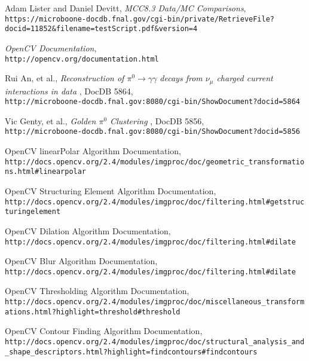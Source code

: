 \begin{thebibliography}{20}
  Adam Lister and Daniel Devitt, \emph{MCC8.3 Data/MC Comparisons},\\
  \texttt{https://microboone-docdb.fnal.gov/cgi-bin/private/RetrieveFile?docid=11852\&filename=testScript.pdf\&version=4} 
  
  \emph{OpenCV Documentation},\\
  \texttt{http://opencv.org/documentation.html}

  Rui An, et al., \emph{Reconstruction of $\pi^0 \rightarrow \gamma\gamma$ decays from $\nu_\mu$ charged current interactions in data }, DocDB 5864,\\
   \texttt{http://microboone-docdb.fnal.gov:8080/cgi-bin/ShowDocument?docid=5864}

   Vic Genty, et al., \emph{Golden $\pi^0$ Clustering }, DocDB 5856,\\
   \texttt{http://microboone-docdb.fnal.gov:8080/cgi-bin/ShowDocument?docid=5856}

  OpenCV linearPolar Algorithm Documentation, \\
  \texttt{http://docs.opencv.org/2.4/modules/imgproc/doc/geometric\_transformations.html\#linearpolar}

  OpenCV Structuring Element Algorithm Documentation, \\
  \texttt{http://docs.opencv.org/2.4/modules/imgproc/doc/filtering.html\#getstructuringelement}

  OpenCV Dilation Algorithm Documentation, \\
  \texttt{http://docs.opencv.org/2.4/modules/imgproc/doc/filtering.html\#dilate}

  OpenCV Blur Algorithm Documentation, \\
  \texttt{http://docs.opencv.org/2.4/modules/imgproc/doc/filtering.html\#dilate}
  
  OpenCV Thresholding Algorithm Documentation, \\
  \texttt{http://docs.opencv.org/2.4/modules/imgproc/doc/miscellaneous\_transformations.html?highlight=threshold\#threshold}
  
  OpenCV Contour Finding Algorithm Documentation, \\
  \texttt{http://docs.opencv.org/2.4/modules/imgproc/doc/structural\_analysis\_and\_shape\_descriptors.html?highlight=findcontours\#findcontours}


\end{thebibliography}
